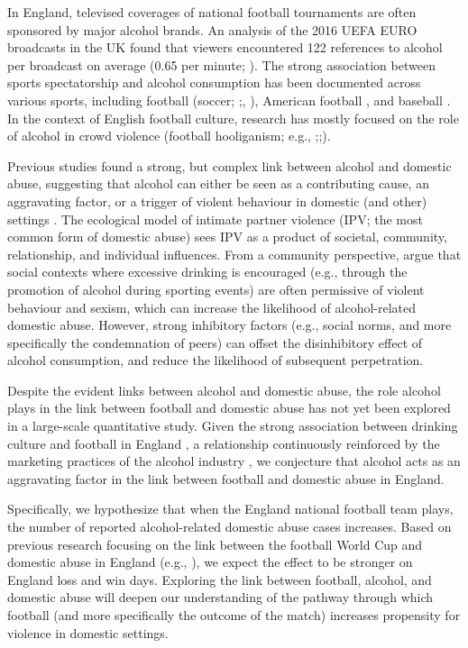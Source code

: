 \documentclass[12pt, a4paper]{article}
\begin{document}
In England, televised coverages of national football tournaments are often sponsored by major alcohol brands. An analysis of the 2016 UEFA EURO broadcasts in the UK found that viewers encountered 122 references to alcohol per broadcast on average (0.65 per minute; ). The strong association between sports spectatorship and alcohol consumption has been documented across various sports, including football (soccer; ;, ), American football \cite{Glassman2011}, and baseball \cite{Erickson2011}. In the context of English football culture, research has mostly focused on the role of alcohol in crowd violence (football hooliganism; e.g., ;;). 

Previous studies found a strong, but complex link between alcohol and domestic abuse, suggesting that alcohol can either be seen as a contributing cause, an aggravating factor, or a trigger of violent behaviour in domestic (and other) settings \cite{Leonard2017}. The ecological model of intimate partner violence (IPV; the most common form of domestic abuse) sees IPV as a product of societal, community, relationship, and individual influences. From a community perspective,  argue that social contexts where excessive drinking is encouraged (e.g., through the promotion of alcohol during sporting events) are often permissive of violent behaviour and sexism, which can increase the likelihood of alcohol-related domestic abuse. However, strong inhibitory factors (e.g., social norms, and more specifically the condemnation of peers) can offset the disinhibitory effect of alcohol consumption, and reduce the likelihood of subsequent perpetration.  



Despite the evident links between alcohol and domestic abuse, the role alcohol plays in the link between football and domestic abuse has not yet been explored in a large-scale quantitative study. Given the strong association between drinking culture and football in England \cite{Dixon2014}, a relationship continuously reinforced by the marketing practices of the alcohol industry \cite{Gornall2014}, we conjecture that alcohol acts as an aggravating factor in the link between football and domestic abuse in England. 

Specifically, we hypothesize that when the England national football team plays, the number of reported alcohol-related domestic abuse cases increases. Based on previous research focusing on the link between the football World Cup and domestic abuse in England (e.g., ), we expect the effect to be stronger on England loss and win days. Exploring the link between football, alcohol, and domestic abuse will deepen our understanding of the pathway through which football (and more specifically the outcome of the match) increases propensity for violence in domestic settings.
\end{document}
